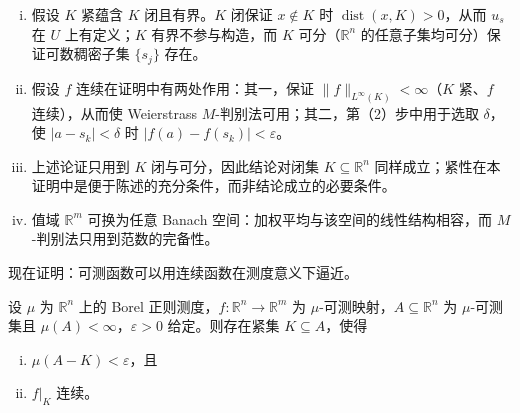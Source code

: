 \documentclass[../../main.tex]{subfiles}%
\begin{document}
\begin{remark}\label{remark:ch01-thm-1-13-条件}
\begin{enumerate}[(i)]
\item 假设 $K$ 紧蕴含 $K$ 闭且有界。$K$ 闭保证 $x\notin K$ 时 $\operatorname{dist}(x,K)>0$，从而 $u_s$ 在 $U$ 上有定义；$K$ 有界不参与构造，而 $K$ 可分（$\mathbb{R}^n$ 的任意子集均可分）保证可数稠密子集 $\{s_j\}$ 存在。
\item 假设 $f$ 连续在证明中有两处作用：其一，保证 $\lVert f\rVert_{L^{\infty}(K)}<\infty$（$K$ 紧、$f$ 连续），从而使 Weierstrass $M$-判别法可用；其二，第（2）步中用于选取 $\delta$，使 $\lvert a-s_k\rvert<\delta$ 时 $\lvert f(a)-f(s_k)\rvert<\varepsilon$。
\item 上述论证只用到 $K$ 闭与可分，因此结论对闭集 $K\subseteq\mathbb{R}^n$ 同样成立；紧性在本证明中是便于陈述的充分条件，而非结论成立的必要条件。
\item 值域 $\mathbb{R}^m$ 可换为任意 Banach 空间：加权平均与该空间的线性结构相容，而 $M$-判别法只用到范数的完备性。
\end{enumerate}
\end{remark}

现在证明：可测函数可以用连续函数在测度意义下逼近。

\begin{theorem}[Lusin 定理]\label{theorem:ch01-1-14}
设 $\mu$ 为 $\mathbb{R}^n$ 上的 Borel 正则测度，$f:\mathbb{R}^n\to\mathbb{R}^m$ 为 $\mu$-可测映射，$A\subseteq\mathbb{R}^n$ 为 $\mu$-可测集且 $\mu(A)<\infty$，$\varepsilon>0$ 给定。则存在紧集 $K\subseteq A$，使得
\begin{enumerate}[(i)]
\item $\mu(A-K)<\varepsilon$，且
\item $f|_K$ 连续。
\end{enumerate}
\end{theorem}
\end{document}
